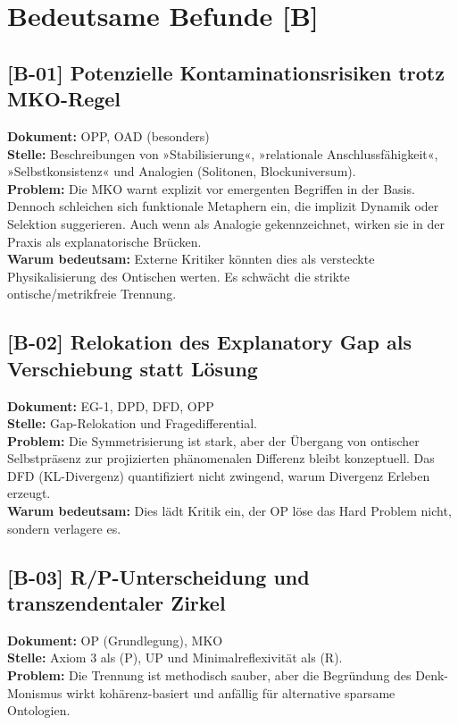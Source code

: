 \documentclass[11pt,a4paper]{article}
\begin{document}
\section*{Bedeutsame Befunde [B]}

\subsection*{[B-01] Potenzielle Kontaminationsrisiken trotz MKO-Regel}
\textbf{Dokument:} OPP, OAD (besonders)\\
\textbf{Stelle:} Beschreibungen von »Stabilisierung«, »relationale Anschlussfähigkeit«, »Selbstkonsistenz« und Analogien (Solitonen, Blockuniversum).\\
\textbf{Problem:} Die MKO warnt explizit vor emergenten Begriffen in der Basis. Dennoch schleichen sich funktionale Metaphern ein, die implizit Dynamik oder Selektion suggerieren. Auch wenn als Analogie gekennzeichnet, wirken sie in der Praxis als explanatorische Brücken.\\
\textbf{Warum bedeutsam:} Externe Kritiker könnten dies als versteckte Physikalisierung des Ontischen werten. Es schwächt die strikte ontische/metrikfreie Trennung.

\subsection*{[B-02] Relokation des Explanatory Gap als Verschiebung statt Lösung}
\textbf{Dokument:} EG-1, DPD, DFD, OPP\\
\textbf{Stelle:} Gap-Relokation und Fragedifferential.\\
\textbf{Problem:} Die Symmetrisierung ist stark, aber der Übergang von ontischer Selbstpräsenz zur projizierten phänomenalen Differenz bleibt konzeptuell. Das DFD (KL-Divergenz) quantifiziert nicht zwingend, warum Divergenz Erleben erzeugt.\\
\textbf{Warum bedeutsam:} Dies lädt Kritik ein, der OP löse das Hard Problem nicht, sondern verlagere es.

\subsection*{[B-03] R/P-Unterscheidung und transzendentaler Zirkel}
\textbf{Dokument:} OP (Grundlegung), MKO\\
\textbf{Stelle:} Axiom 3 als (P), UP und Minimalreflexivität als (R).\\
\textbf{Problem:} Die Trennung ist methodisch sauber, aber die Begründung des Denk-Monismus wirkt kohärenz-basiert und anfällig für alternative sparsame Ontologien.
\end{document}
